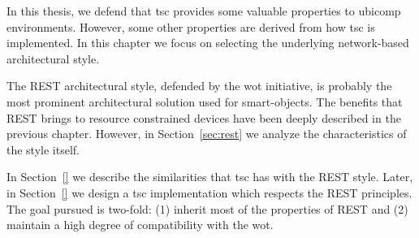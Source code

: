 In this thesis, we defend that \acf{tsc} provides some valuable properties to \ac{ubicomp} environments. %
However, some other properties are derived from how \ac{tsc} is implemented.
In this chapter we focus on selecting the underlying network-based architectural style.


The REST architectural style, defended by the \acf{wot} initiative, is probably the most prominent architectural solution used for smart-objects. %
The benefits that REST brings to resource constrained devices have been deeply described in the previous chapter.
However, in Section~\ref{sec:rest} we analyze the characteristics of the style itself.

In Section~\ref{} we describe the similarities that \ac{tsc} has with the REST style.
Later, in Section~\ref{} we design a \ac{tsc} implementation which respects the REST principles.
The goal pursued is two-fold: (1) inherit most of the properties of REST and (2) maintain a high degree of compatibility with the \ac{wot}.









%
%
%